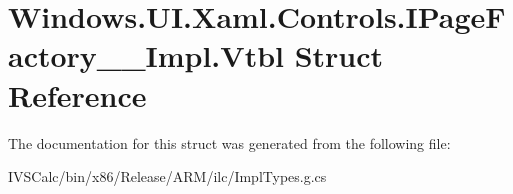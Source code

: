 \hypertarget{struct_windows_1_1_u_i_1_1_xaml_1_1_controls_1_1_i_page_factory_____impl_1_1_vtbl}{}\section{Windows.\+U\+I.\+Xaml.\+Controls.\+I\+Page\+Factory\+\_\+\+\_\+\+Impl.\+Vtbl Struct Reference}
\label{struct_windows_1_1_u_i_1_1_xaml_1_1_controls_1_1_i_page_factory_____impl_1_1_vtbl}


The documentation for this struct was generated from the following file\+:\begin{DoxyCompactItemize}
\item 
I\+V\+S\+Calc/bin/x86/\+Release/\+A\+R\+M/ilc/Impl\+Types.\+g.\+cs\end{DoxyCompactItemize}
